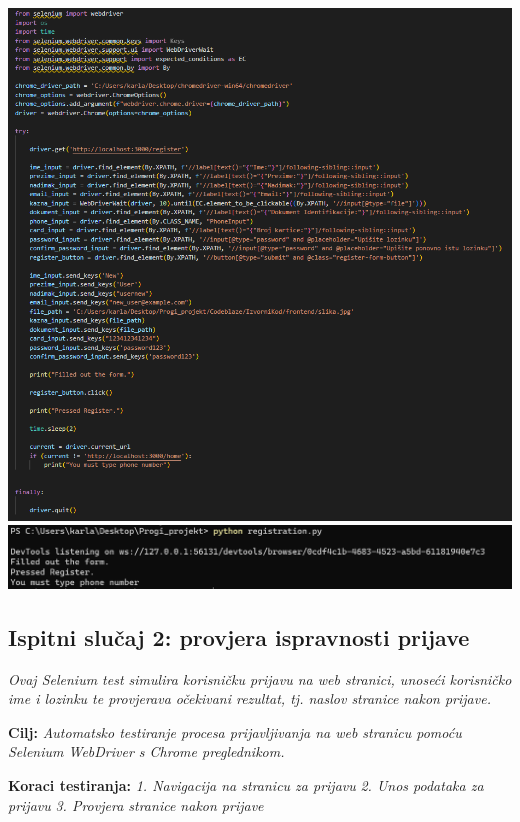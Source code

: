                         \includegraphics[width=1\linewidth]{slike/RegisterSelenium.png}
                        \includegraphics[width=1\linewidth]{slike/RegisterSeleniumOutput.png}


            \subsection{Ispitni slučaj 2: provjera ispravnosti prijave}

                        \textit{Ovaj Selenium test simulira korisničku prijavu na web stranici, unoseći korisničko ime i lozinku te provjerava očekivani rezultat, tj. naslov stranice nakon prijave.}

                                                                        \textbf{Cilj:}
                                                                        \textit{Automatsko testiranje procesa prijavljivanja na web stranicu pomoću Selenium WebDriver s Chrome preglednikom.}

                                                                        \textbf{Koraci testiranja:}
                                                                        \textit{1. Navigacija na stranicu za prijavu}
                                                                        \textit{2. Unos podataka za prijavu}
                                                                        \textit{3. Provjera stranice nakon prijave}



